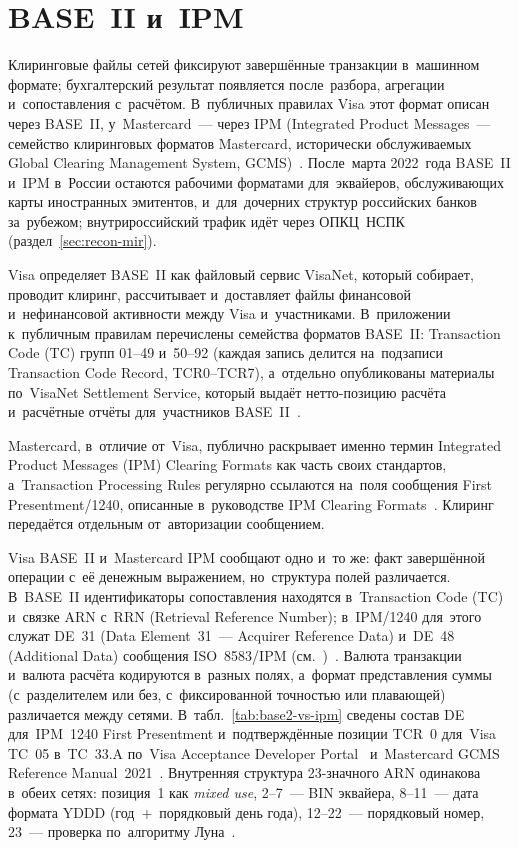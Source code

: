 \section{BASE~II и~IPM}\label{sec:recon-base2-ipm}

Клиринговые файлы сетей фиксируют завершённые транзакции в~машинном
формате; бухгалтерский результат появляется после~разбора, агрегации
и~сопоставления с~расчётом. В~публичных правилах Visa этот формат описан через
BASE~II, у~Mastercard~--- через IPM (Integrated Product Messages~--- семейство
  клиринговых форматов Mastercard, исторически обслуживаемых Global Clearing
  Management System,
GCMS)~\cite{visa-core-rules,mc-pfmi-disclosure,mc-switching-services}.
После~марта 2022~года BASE~II и~IPM в~России остаются рабочими форматами
для~эквайеров, обслуживающих карты иностранных эмитентов, и~для~дочерних
структур российских банков за~рубежом; внутрироссийский трафик идёт через
ОПКЦ~НСПК (раздел~\ref{sec:recon-mir}).

Visa определяет BASE~II как файловый сервис VisaNet, который собирает, проводит
клиринг, рассчитывает и~доставляет файлы финансовой и~нефинансовой активности
между Visa и~участниками. В~приложении к~публичным правилам перечислены
семейства форматов BASE~II: Transaction Code (TC) групп 01--49 и~50--92 (каждая
запись делится на~подзаписи Transaction Code Record, TCR0--TCR7), а~отдельно
опубликованы материалы по~VisaNet Settlement Service, который выдаёт
нетто-позицию расчёта и~расчётные отчёты для~участников
BASE~II~\cite{visa-core-rules}.

Mastercard, в~отличие от~Visa, публично раскрывает именно термин Integrated
Product Messages (IPM) Clearing Formats как часть своих стандартов,
а~Transaction Processing Rules регулярно ссылаются на~поля сообщения First
Presentment/1240, описанные в~руководстве IPM Clearing
Formats~\cite{mc-pfmi-disclosure,mc-tpr}. Клиринг передаётся отдельным
от~авторизации сообщением.

Visa BASE~II и~Mastercard IPM сообщают одно и~то же: факт завершённой операции
с~её денежным выражением, но~структура полей различается. В~BASE~II идентификаторы
сопоставления находятся в~Transaction Code (TC) и~связке ARN с~RRN (Retrieval
Reference Number); в~IPM/1240 для~этого служат DE~31 (Data Element~31~---
Acquirer Reference Data) и~DE~48 (Additional Data) сообщения ISO~8583/IPM
(см.~\cite{iso-8583-2023})~\cite{visa-core-rules,mc-tpr}. Валюта транзакции
и~валюта расчёта кодируются в~разных полях, а~формат представления суммы
(с~разделителем или без, с~фиксированной точностью или плавающей) различается
между сетями. В~табл.~\ref{tab:base2-vs-ipm} сведены состав DE
для~IPM~1240 First Presentment и~подтверждённые позиции TCR~0 для~Visa TC~05
в~TC~33.A по~Visa Acceptance Developer
Portal~\cite{visa-acceptance-capture-spec} и~Mastercard GCMS Reference
Manual~2021~\cite{mc-gcms-rm-2021}. Внутренняя структура 23-значного ARN
одинакова в~обеих сетях: позиция~1 как \textit{mixed use}, 2--7~--- BIN
эквайера, 8--11~--- дата формата YDDD (год~+~порядковый день года), 12--22~---
порядковый номер, 23~--- проверка по~алгоритму Луна~\cite{visa-acceptance-capture-spec}.


